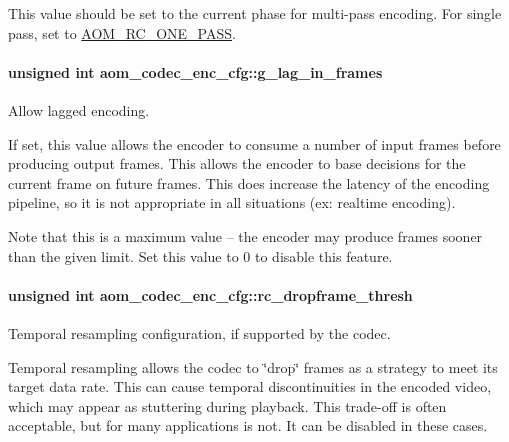 This value should be set to the current phase for multi-\/pass encoding. For single pass, set to \hyperlink{group__encoder_gga92b6709b58dc3435e3ba652da562eda1a1b4b8ee9c1910fc59ac9dfd9700f3f02}{A\+O\+M\+\_\+\+R\+C\+\_\+\+O\+N\+E\+\_\+\+P\+A\+SS}. 
\paragraph[{\texorpdfstring{g\+\_\+lag\+\_\+in\+\_\+frames}{g_lag_in_frames}}]{\setlength{\rightskip}{0pt plus 5cm}unsigned int aom\+\_\+codec\+\_\+enc\+\_\+cfg\+::g\+\_\+lag\+\_\+in\+\_\+frames}\hypertarget{structaom__codec__enc__cfg_a614a49318f2011cc8735d7e51b910fa4}{}\label{structaom__codec__enc__cfg_a614a49318f2011cc8735d7e51b910fa4}


Allow lagged encoding. 

If set, this value allows the encoder to consume a number of input frames before producing output frames. This allows the encoder to base decisions for the current frame on future frames. This does increase the latency of the encoding pipeline, so it is not appropriate in all situations (ex\+: realtime encoding).

Note that this is a maximum value -- the encoder may produce frames sooner than the given limit. Set this value to 0 to disable this feature. 
\paragraph[{\texorpdfstring{rc\+\_\+dropframe\+\_\+thresh}{rc_dropframe_thresh}}]{\setlength{\rightskip}{0pt plus 5cm}unsigned int aom\+\_\+codec\+\_\+enc\+\_\+cfg\+::rc\+\_\+dropframe\+\_\+thresh}\hypertarget{structaom__codec__enc__cfg_a0b64b07e9238ee51f6195b1bbb7cd2fd}{}\label{structaom__codec__enc__cfg_a0b64b07e9238ee51f6195b1bbb7cd2fd}


Temporal resampling configuration, if supported by the codec. 

Temporal resampling allows the codec to \char`\"{}drop\char`\"{} frames as a strategy to meet its target data rate. This can cause temporal discontinuities in the encoded video, which may appear as stuttering during playback. This trade-\/off is often acceptable, but for many applications is not. It can be disabled in these cases.

